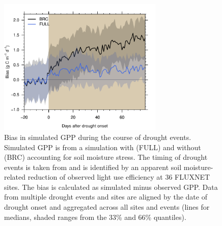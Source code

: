 \documentclass{myreport}
\begin{document}
\begin{figure}[!ht]
    \centering
\includegraphics[width=0.7\textwidth]{fig/droughtresponse.pdf}
    \caption{Bias in simulated GPP during the course of drought events. Simulated GPP is from a simulation with (FULL) and without (BRC) accounting for soil moisture stress. The timing of drought events is taken from \cite{stocker18newphyt} and is identified by an apparent soil moisture-related reduction of observed light use efficiency at 36 FLUXNET sites. The bias is calculated as simulated minus observed GPP. Data from multiple drought events and sites are aligned by the date of drought onset and aggregated across all sites and events (lines for medians, shaded ranges from the 33\% and 66\% quantiles).}
    \label{fig:modobs_droughtresponse}
\end{figure}

\end{document}
